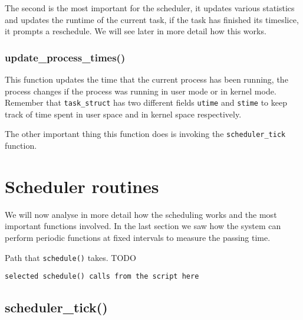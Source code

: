 The second is the most important for the scheduler, it updates various statistics and updates the runtime of the current task, if the task has finished its timeslice, it prompts a reschedule. We will see later in more detail how this works.

\subsubsection{update\_process\_times()}
This function updates the time that the current process has been running, the process changes if the process was running in user mode or in kernel mode. Remember that \verb|task_struct| has two different fields \verb|utime| and \verb|stime| to keep track of time spent in user space and in kernel space respectively.

The other important thing this function does is invoking the \verb|scheduler_tick| function.

\section{Scheduler routines}

We will now analyse in more detail how the scheduling works and the most important functions involved. In the last section we saw how the system can perform periodic functions at fixed intervals to measure the passing time.

Path that \verb|schedule()| takes. TODO

\begin{Verbatim}
selected schedule() calls from the script here
\end{Verbatim}

\subsection{scheduler\_tick()}

